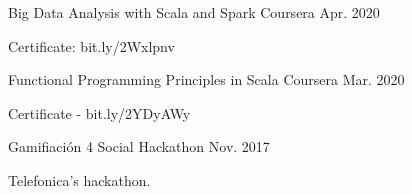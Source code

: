 

\begin{cventries}

  \cventry
    {} %
    {Big Data Analysis with Scala and Spark} %
    {Coursera} %
    {Apr. 2020} %
    {
      \begin{cvitems} %
        \item {Certificate: bit.ly/2Wxlpnv}
      \end{cvitems}
    }

  \cventry
    {} %
    {Functional Programming Principles in Scala} %
    {Coursera} %
    {Mar. 2020} %
    {
      \begin{cvitems} %
        \item {Certificate - bit.ly/2YDyAWy}
      \end{cvitems}
    }

  \cventry
    {} %
    {Gamifiación 4 Social} %
    {Hackathon} %
    {Nov. 2017} %
    {
      \begin{cvitems} %
        \item {Telefonica's hackathon.}
      \end{cvitems}
    }


\end{cventries}
